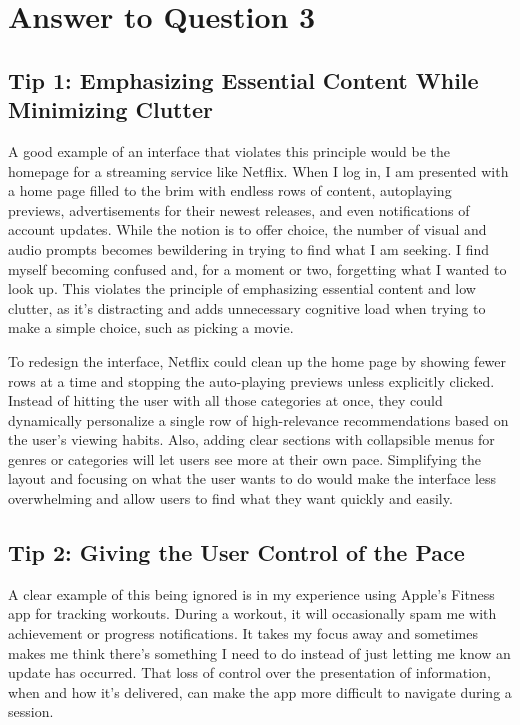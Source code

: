 \documentclass[
	letterpaper, %
]{jdf}
\begin{document}
\newpage

\section{Answer to Question 3}
\subsection {Tip 1: Emphasizing Essential Content While Minimizing Clutter}

A good example of an interface that violates this principle would be the homepage for a streaming service like Netflix. When I log in, I am presented with a home page filled to the brim with endless rows of content, autoplaying previews, advertisements for their newest releases, and even notifications of account updates. While the notion is to offer choice, the number of visual and audio prompts becomes bewildering in trying to find what I am seeking. I find myself becoming confused and, for a moment or two, forgetting what I wanted to look up. This violates the principle of emphasizing essential content and low clutter, as it's distracting and adds unnecessary cognitive load when trying to make a simple choice, such as picking a movie.

To redesign the interface, Netflix could clean up the home page by showing fewer rows at a time and stopping the auto-playing previews unless explicitly clicked. Instead of hitting the user with all those categories at once, they could dynamically personalize a single row of high-relevance recommendations based on the user's viewing habits. Also, adding clear sections with collapsible menus for genres or categories will let users see more at their own pace. Simplifying the layout and focusing on what the user wants to do would make the interface less overwhelming and allow users to find what they want quickly and easily.

\subsection{Tip 2: Giving the User Control of the Pace}

A clear example of this being ignored is in my experience using Apple’s Fitness app for tracking workouts. During a workout, it will occasionally spam me with achievement or progress notifications. It takes my focus away and sometimes makes me think there's something I need to do instead of just letting me know an update has occurred. That loss of control over the presentation of information, when and how it's delivered, can make the app more difficult to navigate during a session.
\end{document}
